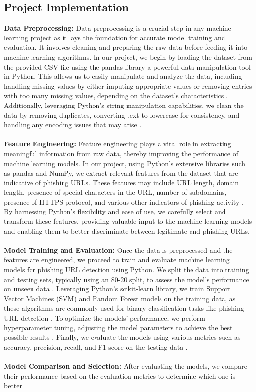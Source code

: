 \documentclass[11pt]{article}
\begin{document}
\subsection{Project Implementation}

\textbf{Data Preprocessing:} Data preprocessing is a crucial step in any machine learning project as it lays the foundation for accurate model training and evaluation. It involves cleaning and preparing the raw data before feeding it into machine learning algorithms. In our project, we begin by loading the dataset from the provided CSV file using the pandas library \cite{mckinney2011pandas} a powerful data manipulation tool in Python. This allows us to easily manipulate and analyze the data, including handling missing values by either imputing appropriate values or removing entries with too many missing values, depending on the dataset’s characteristics  \cite{hernandez2018handling}. Additionally, leveraging Python's string manipulation capabilities, we clean the data by removing duplicates, converting text to lowercase for consistency, and handling any encoding issues that may arise \cite{vanderplas2016python}. \\\\ \textbf{Feature Engineering:} Feature engineering plays a vital role in extracting meaningful information from raw data, thereby improving the performance of machine learning models. In our project, using Python's extensive libraries such as pandas and NumPy, we extract relevant features from the dataset that are indicative of phishing URLs. These features may include URL length, domain length, presence of special characters in the URL, number of subdomains, presence of HTTPS protocol, and various other indicators of phishing activity \cite{brownlee2020feature}. By harnessing Python's flexibility and ease of use, we carefully select and transform these features, providing valuable input to the machine learning models and enabling them to better discriminate between legitimate and phishing URLs. \\\\ \textbf{Model Training and Evaluation:} Once the data is preprocessed and the features are engineered, we proceed to train and evaluate machine learning models for phishing URL detection using Python. We split the data into training and testing sets, typically using an 80-20 split, to assess the model’s performance on unseen data \cite{raschka2019python}. Leveraging Python's scikit-learn library, we train Support Vector Machines (SVM) and Random Forest models on the training data, as these algorithms are commonly used for binary classification tasks like phishing URL detection \cite{raschka2019python}. To optimize the models’ performance, we perform hyperparameter tuning, adjusting the model parameters to achieve the best possible results \cite{bergstra2012random}. Finally, we evaluate the models using various metrics such as accuracy, precision, recall, and F1-score on the testing data \cite{raschka2019python}. \\\\ \textbf{Model Comparison and Selection:} After evaluating the models, we compare their performance based on the evaluation metrics to determine which one is better 
\end{document}
